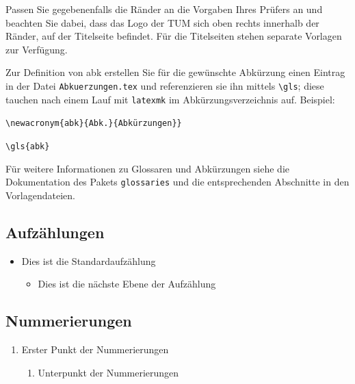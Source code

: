 \clearpage

Passen Sie gegebenenfalls die Ränder an die Vorgaben Ihres Prüfers an und
beachten Sie dabei, dass das Logo der TUM sich oben rechts innerhalb der
Ränder, auf der Titelseite befindet. Für die Titelseiten stehen separate
Vorlagen zur Verfügung.

Zur Definition von \gls{abk} erstellen Sie für die gewünschte Abkürzung einen
Eintrag in der Datei \texttt{Abkuerzungen.tex} und referenzieren sie ihn
mittels \texttt{\textbackslash{}gls}; diese tauchen nach einem Lauf mit
\texttt{latexmk} im Abkürzungsverzeichnis auf. Beispiel:

\vspace{-\baselineskip}
\begin{description}[leftmargin=1em+5mm, labelindent=5mm]
	\item[Definition in \texttt{Abkuerzungen.tex}:] \texttt{\textbackslash{}newacronym\{abk\}\{Abk.\}\{Abkürzungen\}\}}
	\item[Referenzierung:] \texttt{\textbackslash{}gls\{abk\}}
\end{description}

Für weitere Informationen zu Glossaren und Abkürzungen siehe die Dokumentation
des Pakets \texttt{glossaries} und die entsprechenden Abschnitte in den
Vorlagendateien.


\subsection[]{Aufzählungen}

\begin{itemize}
	\item Dies ist die Standardaufzählung
	\begin{itemize}
		\item Dies ist die nächste Ebene der Aufzählung
	\end{itemize}
\end{itemize}


\subsection[]{Nummerierungen}

\begin{enumerate}
	\item Erster Punkt der Nummerierungen
	\begin{enumerate}
		\item Unterpunkt der Nummerierungen
	\end{enumerate}
\end{enumerate}
\clearpage